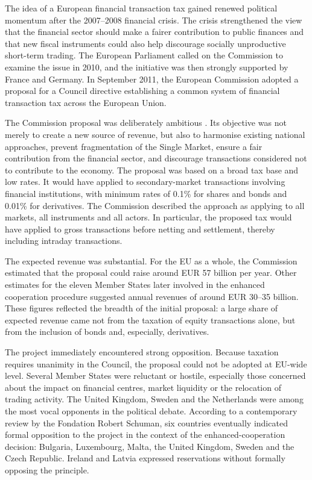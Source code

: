 \documentclass[../../main]{subfiles}
\begin{document}
The idea of a European financial transaction tax gained renewed political momentum after the 2007--2008 financial crisis. The crisis strengthened the view that the financial sector should make a fairer contribution to public finances and that new fiscal instruments could also help discourage socially unproductive short-term trading. The European Parliament called on the Commission to examine the issue in 2010, and the initiative was then strongly supported by France and Germany. In September 2011, the European Commission adopted a proposal for a Council directive establishing a common system of financial transaction tax across the European Union.

The Commission proposal was deliberately ambitious \citep{Gabor2016}. Its objective was not merely to create a new source of revenue, but also to harmonise existing national approaches, prevent fragmentation of the Single Market, ensure a fair contribution from the financial sector, and discourage transactions considered not to contribute to the economy. The proposal was based on a broad tax base and low rates. It would have applied to secondary-market transactions involving financial institutions, with minimum rates of 0.1\% for shares and bonds and 0.01\% for derivatives. The Commission described the approach as applying to all markets, all instruments and all actors. In particular, the proposed tax would have applied to gross transactions before netting and settlement, thereby including intraday transactions.

The expected revenue was substantial. For the EU as a whole, the Commission estimated that the proposal could raise around EUR 57 billion per year. Other estimates for the eleven Member States later involved in the enhanced cooperation procedure suggested annual revenues of around EUR 30--35 billion. These figures reflected the breadth of the initial proposal: a large share of expected revenue came not from the taxation of equity transactions alone, but from the inclusion of bonds and, especially, derivatives.

The project immediately encountered strong opposition. Because taxation requires unanimity in the Council, the proposal could not be adopted at EU-wide level. Several Member States were reluctant or hostile, especially those concerned about the impact on financial centres, market liquidity or the relocation of trading activity. The United Kingdom, Sweden and the Netherlands were among the most vocal opponents in the political debate. According to a contemporary review by the Fondation Robert Schuman, six countries eventually indicated formal opposition to the project in the context of the enhanced-cooperation decision: Bulgaria, Luxembourg, Malta, the United Kingdom, Sweden and the Czech Republic. Ireland and Latvia expressed reservations without formally opposing the principle.
\end{document}
